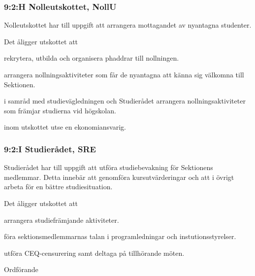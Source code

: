 \documentclass[../_main/handlingar.tex]{subfiles}
\begin{document}
\begin{attsatser}
        \subsubsection*{9:2:H Nolleutskottet, NollU}
        Nolleutskottet har till uppgift att arrangera mottagandet av nyantagna studenter.

        Det åligger utskottet att
        \begin{tightdashlist}
            \item rekrytera, utbilda och organisera phaddrar till nollningen.
            \item arrangera nollningsaktiviteter som får de nyantagna att känna sig välkomna till Sektionen.
            \item i samråd med studievägledningen och Studierådet arrangera nollningsaktiviteter som främjar studierna vid högskolan.
            \item inom utskottet utse en ekonomiansvarig.
        \end{tightdashlist}

        \subsubsection*{9:2:I Studierådet, SRE}
        Studierådet har till uppgift att utföra studiebevakning för Sektionens medlemmar. Detta innebär att genomföra kursutvärderingar och att i övrigt arbeta för en bättre studiesituation.

        Det åligger utskottet att
        \begin{tightdashlist}
        \item arrangera studiefrämjande aktiviteter.
        \item föra sektionsmedlemmarnas talan i programledningar och instutionsstyrelser.
        \item utföra CEQ-censurering samt deltaga på tillhörande möten.
        \end{tightdashlist}
\end{attsatser}

\begin{signatures}{1}
    \ist
    \signature{\ordf}{Ordförande}
\end{signatures}
\end{document}
